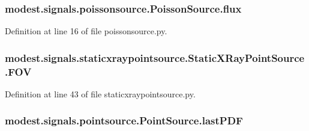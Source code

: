 \subsubsection[{\texorpdfstring{flux}{flux}}]{\setlength{\rightskip}{0pt plus 5cm}modest.\+signals.\+poissonsource.\+Poisson\+Source.\+flux\hspace{0.3cm}{\ttfamily [inherited]}}\hypertarget{classmodest_1_1signals_1_1poissonsource_1_1PoissonSource_a6f2c657ad936b921715d826ac74f7fe5}{}\label{classmodest_1_1signals_1_1poissonsource_1_1PoissonSource_a6f2c657ad936b921715d826ac74f7fe5}


Definition at line 16 of file poissonsource.\+py.

\subsubsection[{\texorpdfstring{F\+OV}{FOV}}]{\setlength{\rightskip}{0pt plus 5cm}modest.\+signals.\+staticxraypointsource.\+Static\+X\+Ray\+Point\+Source.\+F\+OV}\hypertarget{classmodest_1_1signals_1_1staticxraypointsource_1_1StaticXRayPointSource_acecc2d36638c023070193dcb64c8a554}{}\label{classmodest_1_1signals_1_1staticxraypointsource_1_1StaticXRayPointSource_acecc2d36638c023070193dcb64c8a554}


Definition at line 43 of file staticxraypointsource.\+py.

\subsubsection[{\texorpdfstring{last\+P\+DF}{lastPDF}}]{\setlength{\rightskip}{0pt plus 5cm}modest.\+signals.\+pointsource.\+Point\+Source.\+last\+P\+DF\hspace{0.3cm}{\ttfamily [inherited]}}\hypertarget{classmodest_1_1signals_1_1pointsource_1_1PointSource_afde4a069238f53aaa11fbc54584b7a64}{}\label{classmodest_1_1signals_1_1pointsource_1_1PointSource_afde4a069238f53aaa11fbc54584b7a64}


